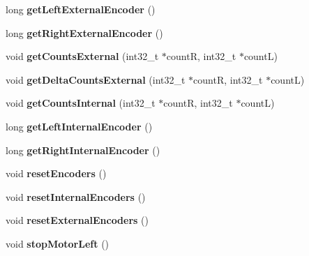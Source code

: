 \begin{DoxyCompactItemize}
\mbox{\label{classAsservDriver_aa6924c9da7428d59fa712c15221dfbac}} 
long {\bfseries get\+Left\+External\+Encoder} ()
\item 
\mbox{\label{classAsservDriver_afda042c513d96188f8572899679cc616}} 
long {\bfseries get\+Right\+External\+Encoder} ()
\item 
\mbox{\label{classAsservDriver_a40d638a52c2ef3c2e98fe4ffa9a7bfe9}} 
void {\bfseries get\+Counts\+External} (int32\+\_\+t $\ast$countR, int32\+\_\+t $\ast$countL)
\item 
\mbox{\label{classAsservDriver_aa1fb745aff64d533ab9567099e4267de}} 
void {\bfseries get\+Delta\+Counts\+External} (int32\+\_\+t $\ast$countR, int32\+\_\+t $\ast$countL)
\item 
\mbox{\label{classAsservDriver_a643c154d40a2842293fcbf433dc73ee1}} 
void {\bfseries get\+Counts\+Internal} (int32\+\_\+t $\ast$countR, int32\+\_\+t $\ast$countL)
\item 
\mbox{\label{classAsservDriver_a01959c5fd48ed61fedfb22a6c3605ea2}} 
long {\bfseries get\+Left\+Internal\+Encoder} ()
\item 
\mbox{\label{classAsservDriver_a00e162296e20e589d7117b2427908aa6}} 
long {\bfseries get\+Right\+Internal\+Encoder} ()
\item 
\mbox{\label{classAsservDriver_a1d4095fd5abc9597f5aa35fc4d02f3fa}} 
void {\bfseries reset\+Encoders} ()
\item 
\mbox{\label{classAsservDriver_a9375c998721a68c0fcdd1c538642fdc6}} 
void {\bfseries reset\+Internal\+Encoders} ()
\item 
\mbox{\label{classAsservDriver_a62108360983265520b0401a71f810f6a}} 
void {\bfseries reset\+External\+Encoders} ()
\item 
\mbox{\label{classAsservDriver_a69fb8c78d0ced7bd7f330c18952c84f4}} 
void {\bfseries stop\+Motor\+Left} ()
\item 

\end{DoxyCompactItemize}
